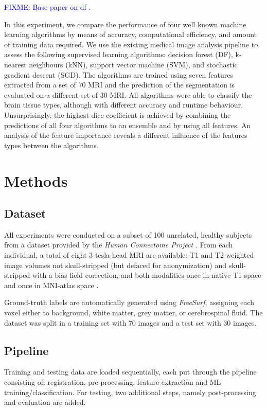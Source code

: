 \documentclass[journal]{IEEEtran}
\newcommand\FIXME[1]{\textcolor{blue}{FIXME: #1}}
\begin{document}
\FIXME{Base paper on df \cite{Breiman2001}.}

In this experiment, we compare the performance of four well known machine learning algorithms by means of accuracy, computational efficiency, and amount of training data required. We use the existing medical image analysis pipeline to assess the following supervised learning algorithms: decision forest (DF), k-nearest neighbours (kNN), support vector machine (SVM), and stochastic gradient descent (SGD). The algorithms are trained using seven features extracted from a set of 70 MRI and the prediction of the segmentation is evaluated on a different set of 30 MRI. All algorithms were able to classify the brain tissue types, although with different accuracy and runtime behaviour. Unsurprisingly, the highest dice coefficient is achieved by combining the predictions of all four algorithms to an ensemble and by using all features. An analysis of the feature importance reveals a different influence of the features types between the algorithms.


\section{Methods}

\subsection{Dataset}
All experiments were conducted on a subset of 100 unrelated, healthy subjects from a dataset provided by the \textit{Human Connectome Project} \cite{van2013wu}. From each individual, a total of eight 3-tesla head MRI are available: T1 and T2-weighted image volumes not skull-stripped (but defaced for anonymization) and skull-stripped with a bias field correction, and both modalities once in native T1 space and once in MNI-atlas space \cite{mazziotta2001probabilistic}.

Ground-truth labels are automatically generated using \textit{FreeSurf}, assigning each voxel either to background, white matter, grey matter, or cerebrospinal fluid. The dataset was split in a training set with 70 images and a test set with 30 images.

\subsection{Pipeline}

Training and testing data are loaded sequentially, each put through the pipeline consisting of: registration, pre-processing, feature extraction and ML training/classification. For testing, two additional steps, namely post-processing and evaluation are added.
\end{document}
